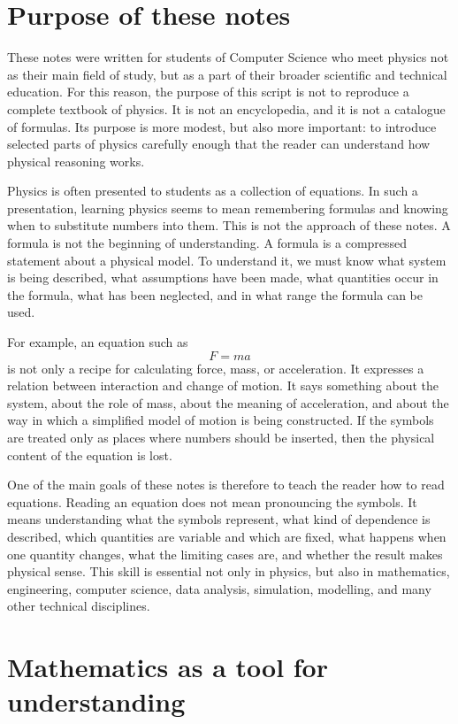 \section{Purpose of these notes}

These notes were written for students of Computer Science who meet physics not as their main field of study, but as a part of their broader scientific and technical education. For this reason, the purpose of this script is not to reproduce a complete textbook of physics. It is not an encyclopedia, and it is not a catalogue of formulas. Its purpose is more modest, but also more important: to introduce selected parts of physics carefully enough that the reader can understand how physical reasoning works.

Physics is often presented to students as a collection of equations. In such a presentation, learning physics seems to mean remembering formulas and knowing when to substitute numbers into them. This is not the approach of these notes. A formula is not the beginning of understanding. A formula is a compressed statement about a physical model. To understand it, we must know what system is being described, what assumptions have been made, what quantities occur in the formula, what has been neglected, and in what range the formula can be used.

For example, an equation such as
\[
F = ma
\]
is not only a recipe for calculating force, mass, or acceleration. It expresses a relation between interaction and change of motion. It says something about the system, about the role of mass, about the meaning of acceleration, and about the way in which a simplified model of motion is being constructed. If the symbols are treated only as places where numbers should be inserted, then the physical content of the equation is lost.

One of the main goals of these notes is therefore to teach the reader how to read equations. Reading an equation does not mean pronouncing the symbols. It means understanding what the symbols represent, what kind of dependence is described, which quantities are variable and which are fixed, what happens when one quantity changes, what the limiting cases are, and whether the result makes physical sense. This skill is essential not only in physics, but also in mathematics, engineering, computer science, data analysis, simulation, modelling, and many other technical disciplines.

\section{Mathematics as a tool for understanding}


